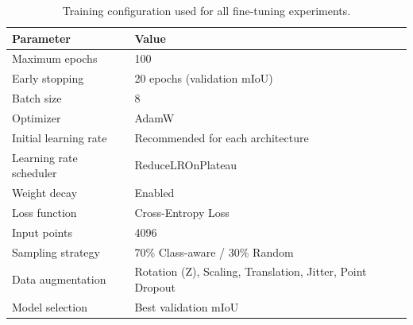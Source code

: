 \begin{table}[H]
\centering
\caption{Training configuration used for all fine-tuning experiments.}
\label{tab:training_configuration}
\begin{tabular}{|l|l|}
\hline
\textbf{Parameter} & \textbf{Value} \\
\hline
Maximum epochs & 100 \\
Early stopping & 20 epochs (validation mIoU) \\
Batch size & 8 \\
Optimizer & AdamW \\
Initial learning rate & Recommended for each architecture \\
Learning rate scheduler & ReduceLROnPlateau \\
Weight decay & Enabled \\
Loss function & Cross-Entropy Loss \\
Input points & 4096 \\
Sampling strategy & 70\% Class-aware / 30\% Random \\
Data augmentation & Rotation (Z), Scaling, Translation, Jitter, Point Dropout \\
Model selection & Best validation mIoU \\
\hline
\end{tabular}
\end{table}